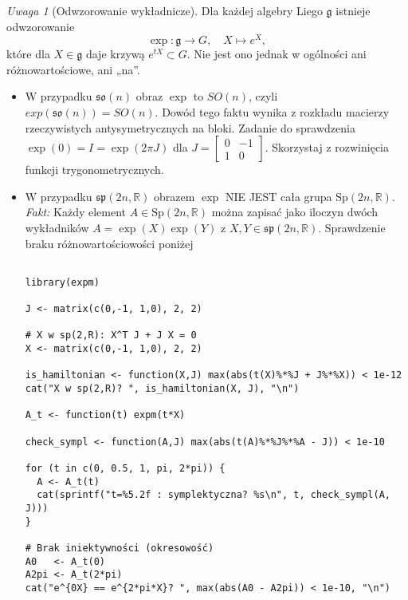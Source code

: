 \documentclass[12pt]{article}
\theoremstyle{plain}
\theoremstyle{remark}
\newtheorem*{remark}{Uwaga}
\newcommand{\R}{\mathbb{R}}
\begin{document}
\begin{remark}[Odwzorowanie wykładnicze]
Dla każdej algebry Liego $\mathfrak{g}$ istnieje odwzorowanie
\[
\exp\colon \mathfrak{g}\to G, \quad X\mapsto e^X,
\]
które dla $X\in\mathfrak{g}$ daje krzywą $e^{tX}\subset G$. 
Nie jest ono jednak w ogólności ani różnowartościowe, ani „na”. 

\begin{itemize}[itemsep=2pt]
  \item W przypadku $\mathfrak{so}(n)$ obraz $\exp$ to $SO(n)$, czyli $exp(\mathfrak{so}(n))=SO(n)$. Dowód tego faktu wynika z rozkładu macierzy rzeczywistych antysymetrycznych na bloki.
        Zadanie do sprawdzenia  $\exp(0)=I=\exp(2\pi J)$ dla $J=\begin{bmatrix}0&-1\\1&0\end{bmatrix}$. Skorzystaj z rozwinięcia funkcji trygonometrycznych.
  \item W przypadku $\mathfrak{sp}(2n,\R)$ obrazem $\exp$  NIE JEST cała grupa $\mathrm{Sp}(2n,\R)$. \emph{Fakt:} Każdy element $A\in \mathrm{Sp}(2n,\R)$ można zapisać jako iloczyn dwóch
wykładników $A=\exp(X)\exp(Y)$ z $X,Y\in\mathfrak{sp}(2n,\R)$.
Sprawdzenie braku różnowartościowości
poniżej

\begin{verbatim}

library(expm)

J <- matrix(c(0,-1, 1,0), 2, 2)

# X w sp(2,R): X^T J + J X = 0
X <- matrix(c(0,-1, 1,0), 2, 2)

is_hamiltonian <- function(X,J) max(abs(t(X)%*%J + J%*%X)) < 1e-12
cat("X w sp(2,R)? ", is_hamiltonian(X, J), "\n")

A_t <- function(t) expm(t*X)

check_sympl <- function(A,J) max(abs(t(A)%*%J%*%A - J)) < 1e-10

for (t in c(0, 0.5, 1, pi, 2*pi)) {
  A <- A_t(t)
  cat(sprintf("t=%5.2f : symplektyczna? %s\n", t, check_sympl(A, J)))
}

# Brak iniektywności (okresowość)
A0   <- A_t(0)
A2pi <- A_t(2*pi)
cat("e^{0X} == e^{2*pi*X}? ", max(abs(A0 - A2pi)) < 1e-10, "\n")


\end{verbatim}
  
  
        
\end{itemize}
\end{remark}
\end{document}
